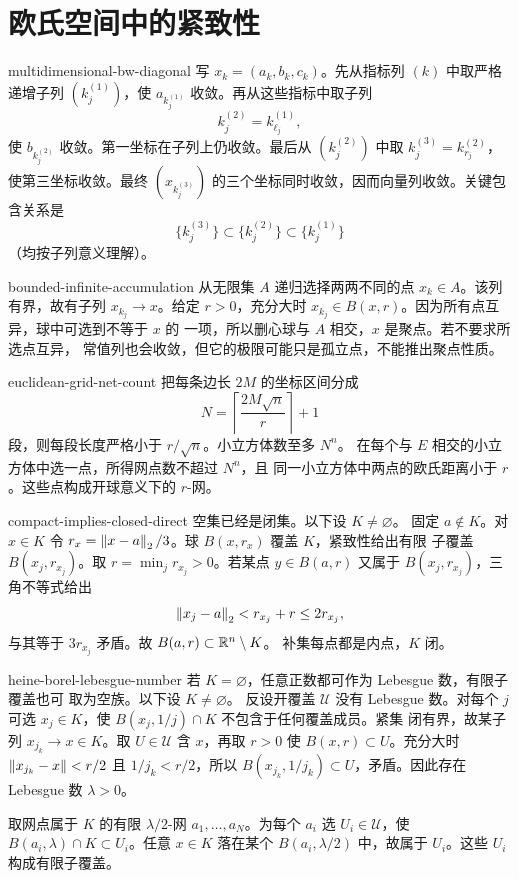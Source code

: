 \chapter{欧氏空间中的紧致性}
\label{chap:euclidean-compactness-solutions}

\begin{solution}{multidimensional-bw-diagonal}
写 \(x_k=(a_k,b_k,c_k)\)。先从指标列 \((k)\) 中取严格递增子列
\((k_j^{(1)})\)，使 \(a_{k_j^{(1)}}\) 收敛。再从这些指标中取子列
\[
 k_j^{(2)}=k_{\ell_j}^{(1)},
\]
使 \(b_{k_j^{(2)}}\) 收敛。第一坐标在子列上仍收敛。最后从
\((k_j^{(2)})\) 中取
\(k_j^{(3)}=k_{r_j}^{(2)}\)，使第三坐标收敛。最终
\((x_{k_j^{(3)}})\) 的三个坐标同时收敛，因而向量列收敛。关键包含关系是
\[
 \{k_j^{(3)}\}\subset\{k_j^{(2)}\}
 \subset\{k_j^{(1)}\}
\]
（均按子列意义理解）。
\end{solution}

\begin{solution}{bounded-infinite-accumulation}
从无限集 \(A\) 递归选择两两不同的点 \(x_k\in A\)。该列有界，故有子列
\(x_{k_j}\to x\)。给定 \(r>0\)，充分大时
\(x_{k_j}\in B(x,r)\)。因为所有点互异，球中可选到不等于 \(x\) 的
一项，所以删心球与 \(A\) 相交，\(x\) 是聚点。若不要求所选点互异，
常值列也会收敛，但它的极限可能只是孤立点，不能推出聚点性质。
\end{solution}

\begin{solution}{euclidean-grid-net-count}
把每条边长 \(2M\) 的坐标区间分成
\[
 N=\left\lceil\frac{2M\sqrt n}{r}\right\rceil+1
\]
段，则每段长度严格小于 \(r/\sqrt n\)。小立方体数至多 \(N^n\)。
在每个与 \(E\) 相交的小立方体中选一点，所得网点数不超过 \(N^n\)，且
同一小立方体中两点的欧氏距离小于 \(r\)。这些点构成开球意义下的
\(r\)-网。
\end{solution}

\begin{solution}{compact-implies-closed-direct}
空集已经是闭集。以下设 \(K\ne\varnothing\)。
固定 \(a\notin K\)。对 \(x\in K\) 令
\(r_x=\left\lVert x-a\right\rVert_2/3\)。球 \(B(x,r_x)\) 覆盖 \(K\)，紧致性给出有限
子覆盖 \(B(x_j,r_{x_j})\)。取 \(r=\min_jr_{x_j}>0\)。若某点
\(y\in B(a,r)\) 又属于 \(B(x_j,r_{x_j})\)，三角不等式给出
\[
 \left\lVert x_j-a\right\rVert_2<r_{x_j}+r\le2r_{x_j},
\]
与其等于 \(3r_{x_j}\) 矛盾。故 \(B(a,r)\subset\mathbb{R}^n\setminus K\)。
补集每点都是内点，\(K\) 闭。
\end{solution}

\begin{solution}{heine-borel-lebesgue-number}
若 \(K=\varnothing\)，任意正数都可作为 Lebesgue 数，有限子覆盖也可
取为空族。以下设 \(K\ne\varnothing\)。
反设开覆盖 \(\mathcal U\) 没有 Lebesgue 数。对每个 \(j\) 可选
\(x_j\in K\)，使 \(B(x_j,1/j)\cap K\) 不包含于任何覆盖成员。紧集
闭有界，故某子列 \(x_{j_k}\to x\in K\)。取 \(U\in\mathcal U\) 含
\(x\)，再取 \(r>0\) 使 \(B(x,r)\subset U\)。充分大时
\(\left\lVert x_{j_k}-x\right\rVert<r/2\) 且 \(1/j_k<r/2\)，所以
\(B(x_{j_k},1/j_k)\subset U\)，矛盾。因此存在 Lebesgue 数
\(\lambda>0\)。

取网点属于 \(K\) 的有限 \(\lambda/2\)-网 \(a_1,\ldots,a_N\)。为每个 \(a_i\)
选 \(U_i\in\mathcal U\)，使
\(B(a_i,\lambda)\cap K\subset U_i\)。任意 \(x\in K\) 落在某个
\(B(a_i,\lambda/2)\) 中，故属于 \(U_i\)。这些 \(U_i\) 构成有限子覆盖。
\end{solution}

